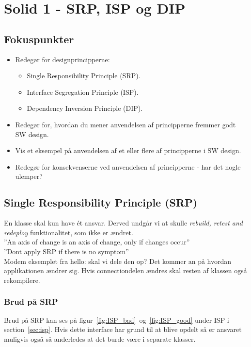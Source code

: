 \section{Solid 1 - SRP, ISP og DIP}

\subsection{Fokuspunkter}

\begin{itemize}
	\item Redegør for designprincipperne:
	\begin{itemize}
		\item Single Responsibility Principle (SRP).
		\item Interface Segregation Principle (ISP).
		\item Dependency Inversion Principle (DIP).
	\end{itemize}
	\item Redegør for, hvordan du mener anvendelsen af principperne fremmer godt SW design.
	\item Vis et eksempel på anvendelsen af et eller flere af principperne i SW design.
	\item Redegør for konsekvenserne ved anvendelsen af principperne - har det nogle ulemper?
\end{itemize}


\subsection{Single Responsibility Principle (SRP)}
En klasse skal kun have ét ansvar. Derved undgår vi at skulle \textit{rebuild, retest and redeploy} funktionalitet, som ikke er ændret.\\

''An axis of change is an axis of change, only if changes occur''\\

''Dont apply SRP if there is no symptom''\\

Modem eksemplet fra hello: skal vi dele den op? Det kommer an på hvordan applikationen ændrer sig. Hvis connectiondelen ændres skal resten af klassen også rekompilere.

\subsubsection{Brud på SRP}
Brud på SRP kan ses på figur~\ref{fig:ISP_bad}~og~\ref{fig:ISP_good} under ISP i section~\ref{sec:isp}. Hvis dette interface har grund til at blive opdelt så er ansvaret muligvis også så anderledes at det burde være i separate klasser.

